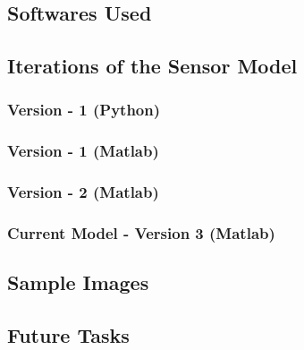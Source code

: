\documentclass[../../main.tex]{subfiles}
\begin{document}
\subsection{Softwares Used}




\subsection{Iterations of the Sensor Model}
\blindtext

\subsubsection{Version - 1 (Python)}
\blindtext

\subsubsection{Version - 1 (Matlab)}
\blindtext

\subsubsection{Version - 2 (Matlab)}
\blindtext

\subsubsection{Current Model - Version 3 (Matlab)}
\blindtext









\subsection{Sample Images}
\blindtext



\subsection{Future Tasks}
\blindtext
\end{document}
